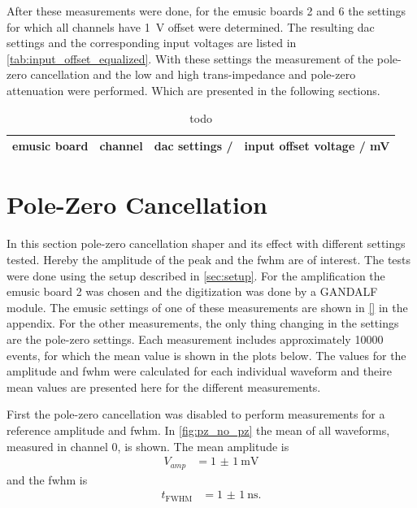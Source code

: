 After these measurements were done, for the \ac{emusic} boards 2 and 6 the settings for which all channels have \SI{1}{\volt} offset were determined.
The resulting \ac{dac} settings and the corresponding input voltages are listed in \autoref{tab:input_offset_equalized}.
With these settings the measurement of the pole-zero cancellation and the low and high trans-impedance and pole-zero attenuation were performed.
Which are presented in the following sections.
\begin{table}
	\centering
	\caption[todo]{todo}
	\label{tab:input_offset_equalized}
	\begin{tabular}{|c|c|c|c|}
	    \ac{emusic} board & channel & \ac{dac} settings / \si{\dacu} & input offset voltage / \si{\milli\volt} \\\hline
	\end{tabular}
\end{table}

\section{Pole-Zero Cancellation}

In this section pole-zero cancellation shaper and its effect with different settings tested.
Hereby the amplitude of the peak and the \ac{fwhm} are of interest.
The tests were done using the setup described in \autoref{sec:setup}.
For the amplification the \ac{emusic} board 2 was chosen and the digitization was done by a GANDALF module.
The \ac{emusic} settings of one of these measurements are shown in \autoref{} in the appendix.
For the other measurements, the only thing changing in the settings are the pole-zero settings.
Each measurement includes approximately \num{10000} events, for which the mean value is shown in the plots below.
The values for the amplitude and \ac{fwhm} were calculated for each individual waveform and theire mean values are presented here for the different measurements.

First the pole-zero cancellation was disabled to perform measurements for a reference amplitude and \ac{fwhm}.
In \autoref{fig:pz_no_pz} the mean of all waveforms, measured in channel 0, is shown.
The mean amplitude is 
\begin{align}
    V_{amp} &= \SI{1(1)}{\milli\volt}
\end{align}
and the \ac{fwhm} is
\begin{align}
    t_\text{FWHM} &= \SI{1(1)}{\nano\second}.
\end{align}

